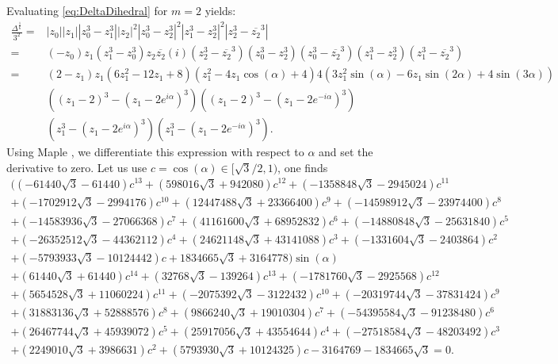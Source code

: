 \documentclass{article}
\theoremstyle{definition}
\begin{document}
Evaluating \cref{eq:DeltaDihedral} for \(m=2\) yields:
\begin{align*}
\frac{\Delta^{\frac16}}{3^2} =& |z_0||z_1||z_0^3-z_1^3| |z_2|^{2}  |z_0^3 - z_2^3|^2 |z_1^3 -z_2^3|^2 |z_2^3- \overline{z_2}^3| \\
=& (-z_0) z_1 (z_1^3-z_0^3) z_2 \overline{z_2} (i)(z_2^3- \overline{z_2}^3)(z_0^3 - z_2^3)(z_0^3 - \overline{z_2}^3) (z_1^3 -z_2^3)(z_1^3 -\overline{z_2}^3)\\
=& (2-z_1) z_1 (6z_1^2-12z_1+8) (z_1^2-4z_1 \cos(\alpha)+4) 4(3z_1^2 \sin(\alpha) -6 z_1 \sin(2\alpha)  +4\sin(3\alpha)  )\\
&((z_1-2)^3 - (z_1-2 e^{i\alpha})^3)((z_1-2)^3 - (z_1-2 e^{-i\alpha})^3)\\
&(z_1^3 -(z_1-2 e^{i\alpha})^3)(z_1^3 -(z_1-2 e^{-i\alpha})^3).
\end{align*}
Using Maple \cite[\texttt{n=12-calculation.mw}]{githubRepo}, we differentiate this expression with respect to $\alpha$ and set the derivative to zero. Let us use \(c=\cos(\alpha)\in[\sqrt3/2,1)\), one finds
\begin{multline}
    ((-61440\sqrt{3} - 61440)c^{13} + (598016\sqrt{3} + 942080)c^{12} + (-1358848\sqrt{3} - 2945024)c^{11} \\
    + (-1702912\sqrt{3} - 2994176)c^{10} + (12447488\sqrt{3} + 23366400)c^9 + (-14598912\sqrt{3} - 23974400)c^8 \\
    + (-14583936\sqrt{3} - 27066368)c^7 + (41161600\sqrt{3} + 68952832)c^6 + (-14880848\sqrt{3} - 25631840)c^5\\
    + (-26352512\sqrt{3} - 44362112)c^4 + (24621148\sqrt{3} + 43141088)c^3 + (-1331604\sqrt{3} - 2403864)c^2 \\
    + (-5793933\sqrt{3} - 10124442)c + 1834665\sqrt{3} + 3164778)\sin(\alpha)\\
    + (61440\sqrt{3} + 61440)c^{14} + (32768\sqrt{3} - 139264)c^{13} + (-1781760\sqrt{3} - 2925568)c^{12}\\
    + (5654528\sqrt{3} + 11060224)c^{11} + (-2075392\sqrt{3} - 3122432)c^{10} + (-20319744\sqrt{3} - 37831424)c^9\\
    + (31883136\sqrt{3} + 52888576)c^8 + (9866240\sqrt{3} + 19010304)c^7 + (-54395584\sqrt{3} - 91238480)c^6 \\
    + (26467744\sqrt{3} + 45939072)c^5 + (25917056\sqrt{3} + 43554644)c^4 + (-27518584\sqrt{3} - 48203492)c^3 \\
    + (2249010\sqrt{3} + 3986631)c^2 + (5793930\sqrt{3} + 10124325)c - 3164769 - 1834665\sqrt{3}=0.
\end{multline}
\end{document}
